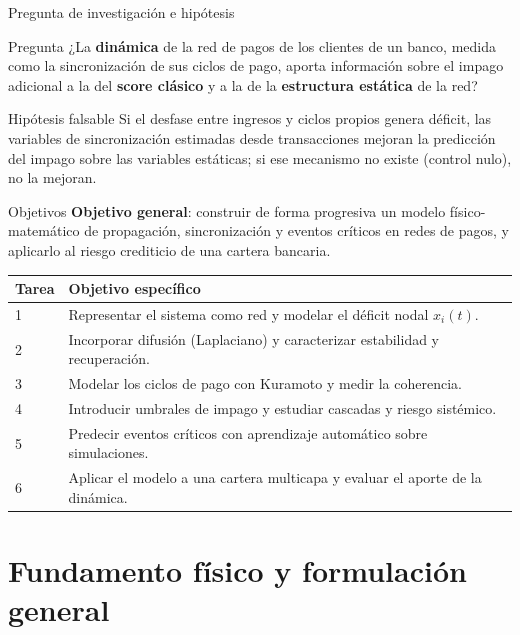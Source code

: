 \documentclass[aspectratio=169,10pt]{beamer}
\begin{document}
\begin{frame}{Pregunta de investigación e hipótesis}
\begin{block}{Pregunta}
¿La \textbf{dinámica} de la red de pagos de los clientes de un banco, medida como la
sincronización de sus ciclos de pago, aporta información sobre el impago adicional a
la del \textbf{score clásico} y a la de la \textbf{estructura estática} de la red?
\end{block}
\begin{exampleblock}{Hipótesis falsable}
Si el desfase entre ingresos y ciclos propios genera déficit, las variables de
sincronización estimadas desde transacciones mejoran la predicción del impago sobre
las variables estáticas; si ese mecanismo no existe (control nulo), no la mejoran.
\end{exampleblock}
\end{frame}

\begin{frame}{Objetivos}
\textbf{Objetivo general}: construir de forma progresiva un modelo físico-matemático de
propagación, sincronización y eventos críticos en redes de pagos, y aplicarlo al riesgo
crediticio de una cartera bancaria.
\vspace{0.2cm}

\small
\begin{tabular}{lp{}}
\toprule
Tarea & Objetivo específico \\
\midrule
1 & Representar el sistema como red y modelar el déficit nodal $x_i(t)$. \\
2 & Incorporar difusión (Laplaciano) y caracterizar estabilidad y recuperación. \\
3 & Modelar los ciclos de pago con Kuramoto y medir la coherencia. \\
4 & Introducir umbrales de impago y estudiar cascadas y riesgo sistémico. \\
5 & Predecir eventos críticos con aprendizaje automático sobre simulaciones. \\
6 & Aplicar el modelo a una cartera multicapa y evaluar el aporte de la dinámica. \\
\bottomrule
\end{tabular}
\end{frame}

\section{Fundamento físico y formulación general}
\end{document}
